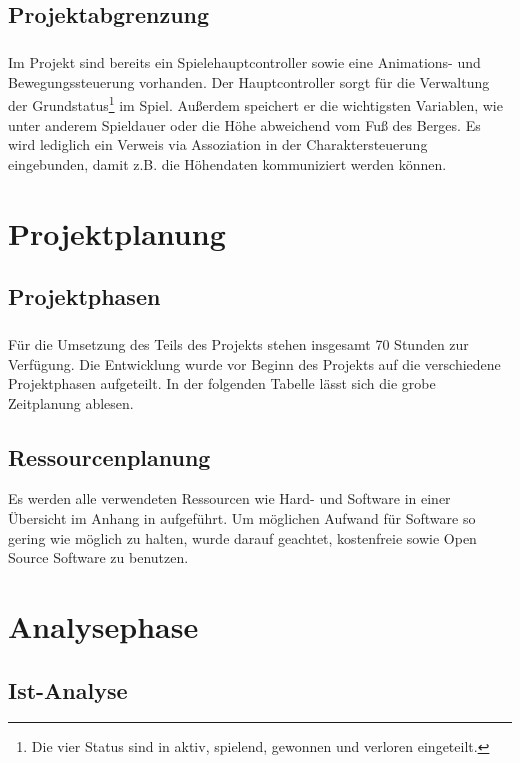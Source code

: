 \section{Projektabgrenzung}
\label{Projektabgrenzung}
\paragraph{}
Im Projekt sind bereits ein Spielehauptcontroller sowie eine Animations- und Bewegungssteuerung vorhanden.
Der Hauptcontroller sorgt für die Verwaltung der Grundstatus\footnote{Die vier Status sind in aktiv, spielend, gewonnen und verloren eingeteilt.} im Spiel. Außerdem speichert er die wichtigsten Variablen, wie unter anderem Spieldauer oder die Höhe abweichend vom Fuß des Berges. Es wird lediglich ein Verweis via Assoziation in der Charaktersteuerung eingebunden, damit z.B. die Höhendaten kommuniziert werden können.

\chapter{Projektplanung}
\section{Projektphasen}
\paragraph{}
Für die Umsetzung des Teils des Projekts stehen insgesamt 70 Stunden zur Verfügung. Die Entwicklung wurde vor Beginn des Projekts auf die verschiedene Projektphasen aufgeteilt. In der folgenden Tabelle  lässt sich die grobe Zeitplanung ablesen.\\


\section{Ressourcenplanung}
Es werden alle verwendeten Ressourcen wie Hard- und Software in einer Übersicht im Anhang in  aufgeführt. Um möglichen Aufwand für Software so gering wie möglich zu halten, wurde darauf geachtet, kostenfreie sowie Open Source Software zu benutzen.

\chapter{Analysephase}
\section{Ist-Analyse}
